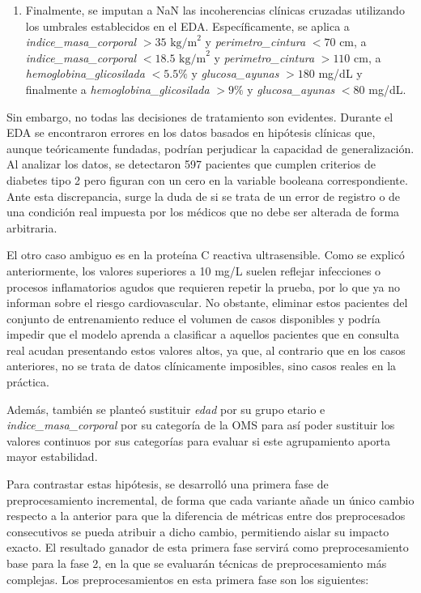 \documentclass[journal,onecolumn]{IEEEtran}
\begin{document}
\begin{enumerate}
    \item Finalmente, se imputan a NaN las incoherencias clínicas cruzadas utilizando los umbrales establecidos en el EDA. Específicamente, se aplica a \textit{indice\_masa\_corporal} $>35\text{ kg/m}^2$ y \textit{perimetro\_cintura} $<70$ cm, a \textit{indice\_masa\_corporal} $<18.5\text{ kg/m}^2$ y \textit{perimetro\_cintura} $>110$ cm, a \textit{hemoglobina\_glicosilada} $<5.5\%$ y \textit{glucosa\_ayunas} $>180$ mg/dL y finalmente a \textit{hemoglobina\_glicosilada} $>9\%$ y \textit{glucosa\_ayunas} $<80$ mg/dL.
\end{enumerate}

Sin embargo, no todas las decisiones de tratamiento son evidentes. Durante el EDA se encontraron errores en los datos basados en hipótesis clínicas que, aunque teóricamente fundadas, podrían perjudicar la capacidad de generalización. Al analizar los datos, se detectaron 597 pacientes que cumplen criterios de diabetes tipo 2 pero figuran con un cero en la variable booleana correspondiente. Ante esta discrepancia, surge la duda de si se trata de un error de registro o de una condición real impuesta por los médicos que no debe ser alterada de forma arbitraria.

El otro caso ambiguo es en la proteína C reactiva ultrasensible. Como se explicó anteriormente, los valores superiores a 10 mg/L suelen reflejar infecciones o procesos inflamatorios agudos que requieren repetir la prueba, por lo que ya no informan sobre el riesgo cardiovascular. No obstante, eliminar estos pacientes del conjunto de entrenamiento reduce el volumen de casos disponibles y podría impedir que el modelo aprenda a clasificar a aquellos pacientes que en consulta real acudan presentando estos valores altos, ya que, al contrario que en los casos anteriores, no se trata de datos clínicamente imposibles, sino casos reales en la práctica.

Además, también se planteó sustituir \textit{edad} por su grupo etario e \textit{indice\_masa\_corporal} por su categoría de la OMS para así poder sustituir los valores continuos por sus categorías para evaluar si este agrupamiento aporta mayor estabilidad.

Para contrastar estas hipótesis, se desarrolló una primera fase de preprocesamiento incremental, de forma que cada variante añade un único cambio respecto a la anterior para que la diferencia de métricas entre dos preprocesados consecutivos se pueda atribuir a dicho cambio, permitiendo aislar su impacto exacto. El resultado ganador de esta primera fase servirá como preprocesamiento base para la fase 2, en la que se evaluarán técnicas de preprocesamiento más complejas. Los preprocesamientos en esta primera fase son los siguientes:
\end{document}
